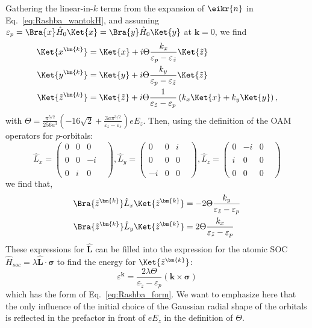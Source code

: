 Gathering the linear-in-$k$ terms from the expansion of $\eikr{n}$ in Eq.~\ref{eq:Rashba_wantokH}, and assuming $\varepsilon_p = \Bra{x} \hat{H}_0 \Ket{x} = \Bra{y} \hat{H}_0 \Ket{y}$ at $\bm{k}=0$, we find
\begin{align}
	\Ket{x^{\bm{k}}} &= \Ket{x} + i \Theta \frac{k_x}{\varepsilon_p - \varepsilon_{\tilde{z}}}\Ket{\tilde{z}} \\
	\Ket{y^{\bm{k}}} &= \Ket{y} + i \Theta \frac{k_y}{\varepsilon_p - \varepsilon_{\tilde{z}}}\Ket{\tilde{z}}\\
	\Ket{\tilde{z}^{\bm{k}}} &= \Ket{\tilde{z}} + i \Theta \frac{1}{\varepsilon_{\tilde{z}} - \varepsilon_p} \left(k_x\Ket{x} + k_y\Ket{y}\right),
\end{align}
with $\Theta = \frac{\pi^{5/2}}{256 a^3 }\left(-16\sqrt{2} + \frac{3a\pi^{3/2}}{\varepsilon_z - \varepsilon_s}\right) e E_z$.
Then, using the definition of the OAM operators for $p$-orbitals:
\begin{equation}
	\hat{L}_x =\left(\begin{matrix}0&0&0\\\\0&0&-i\\\\0&i&0&\end{matrix}\right), \hat{L}_y =\left(\begin{matrix}0&0&i\\\\0&0&0\\\\-i&0&0&\end{matrix}\right), \hat{L}_z =\left(\begin{matrix}0&-i&0\\\\i&0&0\\\\0&0&0&\end{matrix}\right)
\end{equation}
we find that,
\begin{align}
	\label{eq:oam_from_k}
	\Bra{\tilde{z}^{\bm{k}}} \hat{L}_x \Ket{\tilde{z}^{\bm{k}}} &= - 2 \Theta \frac{k_y}{\varepsilon_{\tilde{z}} - \varepsilon_p}\\ 
	\Bra{\tilde{z}^{\bm{k}}} \hat{L}_y \Ket{\tilde{z}^{\bm{k}}} &= 2 \Theta \frac{k_x}{\varepsilon_{\tilde{z}}-\varepsilon_p} 
\end{align}
These expressions for $\hat{\bm{L}}$ can be filled into the expression for the atomic SOC $\hat{H}_{soc}= \lambda \hat{\bm{L}} \cdot \hat{\bm{\sigma}}$ to find the energy for $\Ket{\tilde{z}^{\bm{k}}}$:
\begin{equation}
	\label{eq:Rashba_from_OAM}
	\varepsilon^{\bm{k}} = \frac{2 \lambda \Theta}{\varepsilon_{\tilde{z}}-\varepsilon_p}(\bm{k} \times \bm{\sigma})
\end{equation}
which has the form of Eq.~\ref{eq:Rashba_form}.
We want to emphasize here that the only influence of the initial choice of the Gaussian radial shape of the orbitals is reflected in the prefactor in front of $e E_z$ in the definition of $\Theta$.

